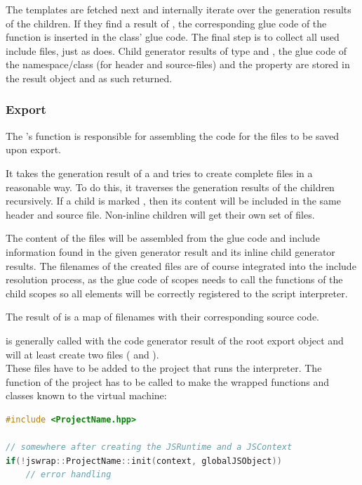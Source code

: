 The templates are fetched next and internally iterate over the generation results of the children. If they find a result of  , the corresponding glue code of the function is inserted in the class' glue code.
The final step is to collect all used include files, just as  does.  Child generator results of type  and , the glue code of the namespace/class (for header and source-files) and the  property are stored in the result object and as such returned.

\subsubsection{Export}

The 's  function is responsible for assembling the code for the files to be saved upon export. 

It takes the generation result of a  and tries to create complete files in a reasonable way. To do this, it traverses the generation results of the children recursively. If a child is marked , then its content will be included in the same header and source file. Non-inline children will get their own set of files.

The content of the files will be assembled from the glue code and include information found in the given generator result and its inline child generator results. The filenames of the created files are of course integrated into the include resolution process, as the glue code of scopes needs to call the  functions of the child scopes so all elements will be correctly registered to the script interpreter.

The result of  is a map of filenames with their corresponding source code.

 is generally called with the code generator result of the root export object and will at least create two files ( and ).\\
These files have to be added to the  project that runs the  interpreter. The  function of the project has to be called to make the wrapped functions and classes known to the virtual machine:

\SingleSpacing
\begin{lstlisting}[language=C++, caption=Initializing the wrapped elements]
#include <ProjectName.hpp>

// somewhere after creating the JSRuntime and a JSContext
if(!jswrap::ProjectName::init(context, globalJSObject))
	// error handling
\end{lstlisting}
\OnehalfSpacing

